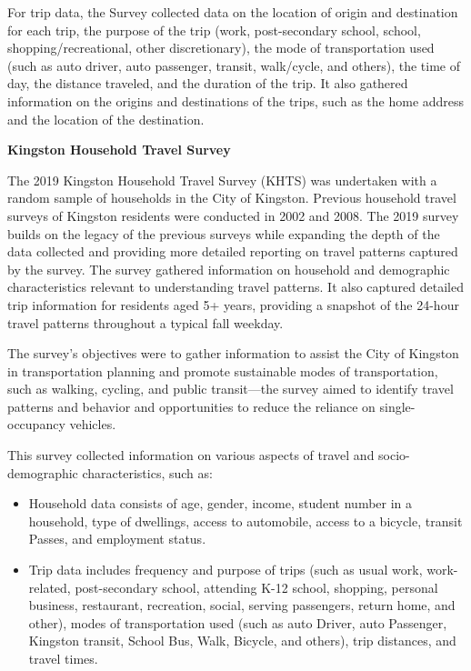\documentclass[
11pt, %
oneside, %
english, %
singlespacing, %
]{macthesis} %
\begin{document}
For trip data, the Survey collected data on the location of origin and destination for each trip, the purpose of the trip (work, post-secondary school, school, shopping/recreational, other discretionary), the mode of transportation used (such as auto driver, auto passenger, transit, walk/cycle, and others), the time of day, the distance traveled, and the duration of the trip. It also gathered information on the origins and destinations of the trips, such as the home address and the location of the destination.

\textbf{Kingston Household Travel Survey}

The 2019 Kingston Household Travel Survey (KHTS) was undertaken with a random sample of households in the City of Kingston. Previous household travel surveys of Kingston residents were conducted in 2002 and 2008. The 2019 survey builds on the legacy of the previous surveys while expanding the depth of the data collected and providing more detailed reporting on travel patterns captured by the survey. The survey gathered information on household and demographic characteristics relevant to understanding travel patterns. It also captured detailed trip information for residents aged 5+ years, providing a snapshot of the 24-hour travel patterns throughout a typical fall weekday.

The survey's objectives were to gather information to assist the City of Kingston in transportation planning and promote sustainable modes of transportation, such as walking, cycling, and public transit---the survey aimed to identify travel patterns and behavior and opportunities to reduce the reliance on single-occupancy vehicles.

This survey collected information on various aspects of travel and socio-demographic characteristics, such as:

\begin{itemize}
\item
  Household data consists of age, gender, income, student number in a household, type of dwellings, access to automobile, access to a bicycle, transit Passes, and employment status.
\item
  Trip data includes frequency and purpose of trips (such as usual work, work-related, post-secondary school, attending K-12 school, shopping, personal business, restaurant, recreation, social, serving passengers, return home, and other), modes of transportation used (such as auto Driver, auto Passenger, Kingston transit, School Bus, Walk, Bicycle, and others), trip distances, and travel times.
\end{itemize}
\end{document}
